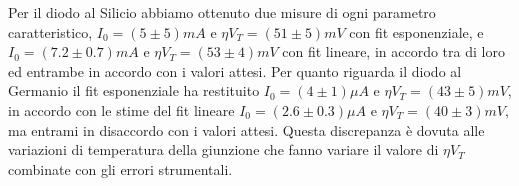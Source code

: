 \documentclass[]{article}
\begin{document}
Per il diodo al Silicio abbiamo ottenuto due misure di ogni parametro caratteristico, $I_0=(5\pm5)mA$ e $\eta V_T=(51\pm5)mV$ con fit esponenziale, e $I_0=(7.2\pm0.7)mA$ e $\eta V_T=(53\pm4)mV$ con fit lineare, in accordo tra di loro ed entrambe in accordo con i valori attesi. Per quanto riguarda il diodo al Germanio il fit esponenziale ha restituito $I_0=(4\pm1)\mu A$ e $\eta V_T=(43\pm5)mV$, in accordo con le stime del fit lineare $I_0=(2.6\pm0.3)\mu A$ e $\eta V_T=(40\pm3)mV$, ma entrami in disaccordo con i valori attesi. Questa discrepanza è dovuta alle variazioni di temperatura della giunzione che fanno variare il valore di $\eta V_T$ combinate con gli errori strumentali.
\end{document}
